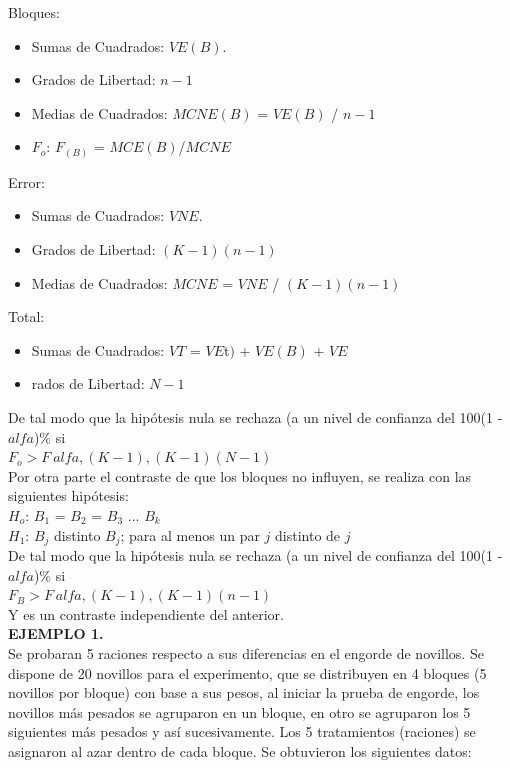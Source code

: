 \documentclass[12pt,letterpaper]{article}\usepackage[]{graphicx}\usepackage[]{color}
\begin{document}
Bloques:
\begin{itemize}
  \item Sumas de Cuadrados: $VE(B)$.
  \item Grados de Libertad: $n - 1$
  \item Medias de Cuadrados: $MCNE(B)$ = $VE(B)$ / $n-1$
  \item $F_o$: $F_(B)$ = $MCE(B)$/$MCNE$
\end{itemize}

Error:
\begin{itemize}
  \item Sumas de Cuadrados: $VNE$.
  \item Grados de Libertad: $(K - 1)(n - 1)$
  \item Medias de Cuadrados: $MCNE$ = $VNE$ / $(K - 1)(n - 1)$
\end{itemize}

Total:
\begin{itemize}
  \item Sumas de Cuadrados: $VT$ = $VE$t$)$ + $VE(B)$ + $VE$
  \item rados de Libertad: $N - 1$
\end{itemize}

De tal modo que la hip\'otesis nula se rechaza (a un nivel de confianza del  100(1 - $alfa$)\% si\\

$F_o$$>$$F_\ alfa,(K-1),(K-1)(N-1)$\\

Por otra parte el contraste de que los bloques no influyen, se realiza con las siguientes hip\'otesis:\\

$H_o$: $B_1$ = $B_2$ = $B_3$ ... $B_k$ \\

$H_1$: $B_j$ distinto $B_j$; para al menos un par $j$ distinto de $j$\\

De tal modo que la hip\'otesis nula se rechaza (a un nivel de confianza del 100(1 - $alfa$)\% si\\

$F_B$$>$$F_\ alfa,(K-1),(K-1)(n-1)$\\

Y es un contraste independiente del anterior.\\ 

\textbf{EJEMPLO 1.}\\

Se probaran 5 raciones respecto a sus diferencias en el engorde de novillos. Se dispone de 20 novillos para el experimento, que se distribuyen en 4 bloques (5 novillos por bloque) con base a sus pesos, al iniciar la prueba de engorde, los novillos más pesados se agruparon en un bloque, en otro se agruparon los 5 siguientes m\'as pesados y as\'i sucesivamente. Los 5 tratamientos (raciones) se asignaron al azar dentro de cada bloque. Se obtuvieron los siguientes datos:
\end{document}
